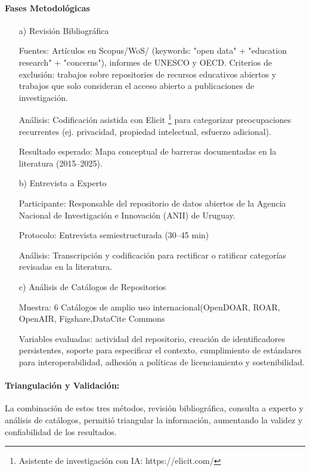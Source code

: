 \documentclass[runningheads]{llncs}
\begin{document}
\paragraph{Fases Metodológicas}
\begin{itemize}
    \item [a)] Revisión Bibliográfica
    
Fuentes: Artículos en Scopus/WoS/ (keywords: "open data" + "education research" + "concerns"), informes de UNESCO y OECD. Criterios de exclusión: trabajos sobre repositories de recursos educativos abiertos y trabajos que solo consideran el acceso abierto a publicaciones de investigación.

Análisis: Codificación asistida con Elicit \footnote{Asistente de investigación con IA: https://elicit.com/} para categorizar preocupaciones recurrentes (ej. privacidad, propiedad intelectual, esfuerzo adicional).

Resultado esperado: Mapa conceptual de barreras documentadas en la literatura (2015–2025).

\item [b)]  Entrevista a Experto

Participante: Responsable del repositorio de datos abiertos de la Agencia Nacional de Investigación e Innovación (ANII) de Uruguay.

Protocolo: Entrevista semiestructurada (30–45 min) 

Análisis: Transcripción y codificación para rectificar o ratificar categorías revisadas en la literatura.

\item [c)] Análisis de Catálogos de Repositorios

    Muestra:  6 Catálogos de amplio uso internacional(OpenDOAR, ROAR, OpenAIR, Figshare,DataCite Commons
    
    Variables evaluadas: actividad del repositorio, creación de identificadores persistentes, soporte para especificar el contexto, cumplimiento de estándares para interoperabilidad,  adhesión a políticas de licenciamiento y sostenibilidad.

\end{itemize}

\paragraph{Triangulación y Validación:}
 La combinación de estos tres métodos, revisión bibliográfica, consulta a experto y análisis de catálogos, permitió triangular la información, aumentando la validez y confiabilidad de los resultados.
\end{document}
